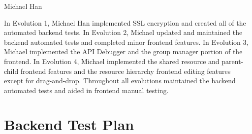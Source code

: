 \documentclass[12pt]{article}
\begin{document}
Michael Han

In Evolution 1, Michael Han implemented SSL encryption and created all of the automated backend tests. In Evolution 2, Michael updated and maintained the backend automated tests and completed minor frontend features. In Evolution 3, Michael implemented the API Debugger and the group manager portion of the frontend. In Evolution 4, Michael implemented the shared resource and parent-child frontend features and the resource hierarchy frontend editing features except for drag-and-drop. Throughout all evolutions maintained the backend automated tests and aided in frontend manual testing.


\clearpage
\appendix
\section{Backend Test Plan}
\label{appendix:backendtest}
\end{document}
